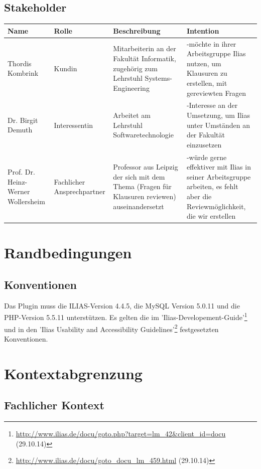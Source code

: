 \documentclass[a4paper]{scrreprt}
\begin{document}
\section{Stakeholder}

\begin{tabular}{|p{3.5cm}|p{2.3cm}|p{3cm}|p{4cm}|}\hline
Name & Rolle & Beschreibung & Intention \\\hline
Thordis Kombrink & Kundin & Mitarbeiterin an der Fakultät Informatik, zugehörig zum Lehrstuhl Systems-Engineering & -möchte in ihrer Arbeitsgruppe Ilias nutzen, um Klausuren zu erstellen, mit gereviewten Fragen\\\hline
Dr. Birgit Demuth & Interessentin & Arbeitet am Lehrstuhl Softwaretechnologie & -Interesse an der Umsetzung, um Ilias unter Umständen an der Fakultät einzusetzen\\\hline
Prof. Dr. Heinz-Werner Wollersheim & Fachlicher Ansprechpartner & Professor aus Leipzig der sich mit dem Thema (Fragen für Klausuren reviewen) auseinandersetzt & -würde gerne effektiver mit Ilias in seiner Arbeitsgruppe arbeiten, es fehlt aber die Reviewmöglichkeit, die wir erstellen\\\hline
\end{tabular}

\chapter{Randbedingungen}

\section{Konventionen} 

Das Plugin muss die ILIAS-Version 4.4.5, die MySQL Version 5.0.11 und die PHP-Version 5.5.11 unterstützen.
Es gelten die im 'Ilias-Developement-Guide'\footnote{\url{http://www.ilias.de/docu/goto.php?target=lm_42&client_id=docu} (29.10.14)} und in den 'Ilias Usability and Accessibility Guidelines'\footnote{\url{http://www.ilias.de/docu/goto_docu_lm_459.html} (29.10.14)} festgesetzten Konventionen.

\chapter{Kontextabgrenzung}

\section{Fachlicher Kontext}
\end{document}
